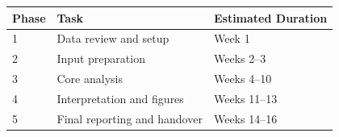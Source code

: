 \begin{tabularx}{\textwidth}{p{2cm}p{5cm}X}
\toprule
\textbf{Phase} & \textbf{Task} & \textbf{Estimated Duration} \\
\midrule
1 & Data review and setup & Week 1 \\
2 & Input preparation & Weeks 2--3 \\
3 & Core analysis & Weeks 4--10 \\
4 & Interpretation and figures & Weeks 11--13 \\
5 & Final reporting and handover & Weeks 14--16 \\
\bottomrule
\end{tabularx}